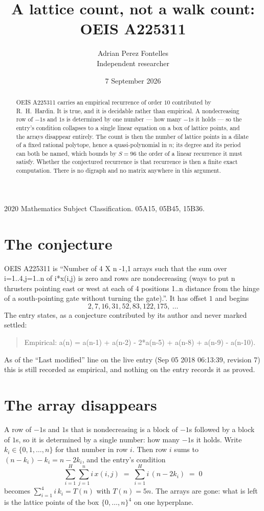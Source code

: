 \documentclass[11pt,a4paper]{article}
\title{A lattice count, not a walk count: OEIS A225311}
\author{Adrian Perez Fontelles\\ \small Independent researcher}
\date{7 September 2026}
\theoremstyle{plain}
\theoremstyle{definition}
\begin{document}
\maketitle

\begin{abstract}
OEIS A225311 carries an empirical recurrence of order $10$ contributed by R.~H.~Hardin. It is
true, and it is decidable rather than empirical. A nondecreasing row of $-1$s and $1$s is
determined by one number --- how many $-1$s it holds --- so the entry's condition collapses to
a single linear equation on a box of lattice points, and the arrays disappear entirely. The
count is then the number of lattice points in a dilate of a fixed rational polytope, hence a
quasi-polynomial in $n$; its degree and its period can both be named, which bounds by
$S=96$ the order of a linear recurrence it must satisfy. Whether the conjectured recurrence
is that recurrence is then a finite exact computation. There is no digraph and no matrix
anywhere in this argument.
\end{abstract}

\noindent\small 2020 Mathematics Subject Classification. 05A15, 05B45, 15B36.\normalsize

\section{The conjecture}

OEIS A225311 is ``Number of 4 X n -1,1 arrays such that the sum over i=1..4,j=1..n of i*x(i,j) is zero and rows are nondecreasing (ways to put n thrusters pointing east or west at each of 4 positions 1..n distance from the hinge of a south-pointing gate without turning the gate).''. It has offset $1$ and begins
\[
2, 7, 16, 31, 52, 83, 122, 175,\ \dots
\]
The entry states, as a conjecture contributed by its author and never marked settled:
\begin{quote}
Empirical: a(n) = a(n-1) + a(n-2) - 2*a(n-5) + a(n-8) + a(n-9) - a(n-10).
\end{quote}
As of the ``Last modified'' line on the live entry (Sep 05 2018 06:13:39, revision 7) this is still
recorded as empirical, and nothing on the entry records it as proved.

\section{The array disappears}

A row of $-1$s and $1$s that is nondecreasing is a block of $-1$s followed by a block of $1$s, so it is determined by a single number: how many $-1$s it holds. Write $k_i\in\{0,1,\dots,n\}$ for that number in row $i$. Then row $i$ sums to $(n-k_i)-k_i = n-2k_i$, and the entry's condition
\[ \sum_{i=1}^{H}\sum_{j=1}^{n} i\,x(i,j) \;=\; \sum_{i=1}^{H} i\,(n-2k_i) \;=\; 0 \]
becomes $\sum_{i=1}^{4} i\,k_i = T(n)$ with $T(n)=5n$. The arrays are gone: what is left is the lattice points of the box $\{0,\dots,n\}^{4}$ on one hyperplane.
\end{document}
